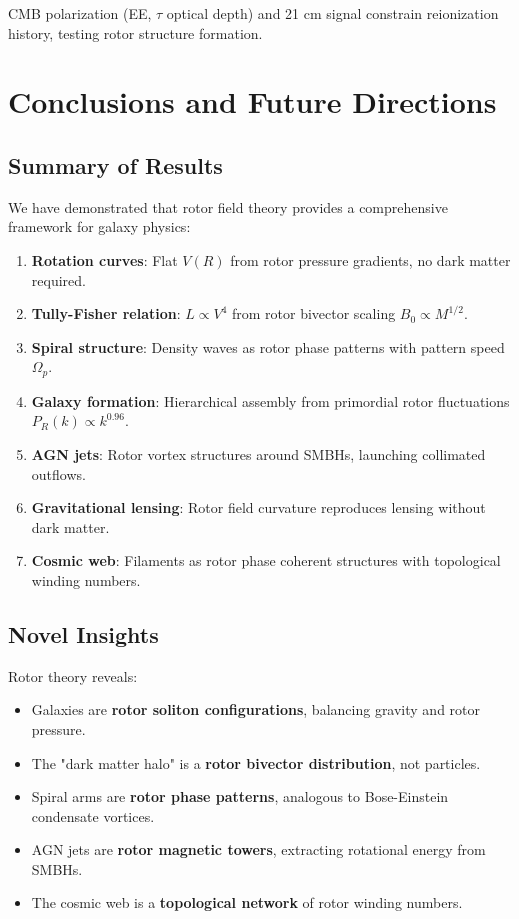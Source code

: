 \documentclass[12pt,a4paper]{article}
\theoremstyle{definition}
\theoremstyle{remark}
\begin{document}
CMB polarization (EE, $\tau$ optical depth) and 21 cm signal constrain reionization history, testing rotor structure formation.

\section{Conclusions and Future Directions}

\subsection{Summary of Results}

We have demonstrated that rotor field theory provides a comprehensive framework for galaxy physics:

\begin{enumerate}
\item \textbf{Rotation curves}: Flat $V(R)$ from rotor pressure gradients, no dark matter required.
\item \textbf{Tully-Fisher relation}: $L \propto V^4$ from rotor bivector scaling $B_0 \propto M^{1/2}$.
\item \textbf{Spiral structure}: Density waves as rotor phase patterns with pattern speed $\Omega_p$.
\item \textbf{Galaxy formation}: Hierarchical assembly from primordial rotor fluctuations $P_R(k) \propto k^{0.96}$.
\item \textbf{AGN jets}: Rotor vortex structures around SMBHs, launching collimated outflows.
\item \textbf{Gravitational lensing}: Rotor field curvature reproduces lensing without dark matter.
\item \textbf{Cosmic web}: Filaments as rotor phase coherent structures with topological winding numbers.
\end{enumerate}

\subsection{Novel Insights}

Rotor theory reveals:
\begin{itemize}
\item Galaxies are \textbf{rotor soliton configurations}, balancing gravity and rotor pressure.
\item The "dark matter halo" is a \textbf{rotor bivector distribution}, not particles.
\item Spiral arms are \textbf{rotor phase patterns}, analogous to Bose-Einstein condensate vortices.
\item AGN jets are \textbf{rotor magnetic towers}, extracting rotational energy from SMBHs.
\item The cosmic web is a \textbf{topological network} of rotor winding numbers.
\end{itemize}
\end{document}
